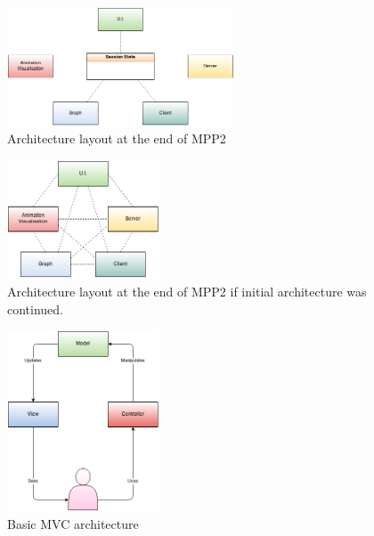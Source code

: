 \begin{figure}[h!]
    \centering
    \includegraphics[width=0.6\textwidth]{images/final_architecture.png}
    \caption{Architecture layout at the end of MPP2}
    \label{fig:final_architecture}
\end{figure}

\begin{figure}[h!]
    \centering
    \includegraphics[width=0.4\textwidth]{images/initial_architecture_future.png}
    \caption{Architecture layout at the end of MPP2 if initial architecture was continued.}
    \label{fig:initial_architecture_future}
\end{figure}

\begin{figure}[h!]
    \centering
    \includegraphics[width=0.4\textwidth]{images/mvc.png}
    \caption{Basic \ac{MVC} architecture}
    \label{fig:mvc}
\end{figure}

